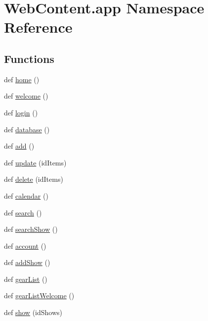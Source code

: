 \hypertarget{namespace_web_content_1_1app}{}\section{Web\+Content.\+app Namespace Reference}
\label{namespace_web_content_1_1app}
\subsection*{Functions}
\begin{DoxyCompactItemize}
\item 
def \hyperlink{namespace_web_content_1_1app_ab0090e2c92ec892cf11fed49d580737a}{home} ()
\item 
def \hyperlink{namespace_web_content_1_1app_ac220a4f6d552ae239a9fe5a933eb4c0d}{welcome} ()
\item 
def \hyperlink{namespace_web_content_1_1app_a1e55cf68c2c2c883c82749a8725e068c}{login} ()
\item 
def \hyperlink{namespace_web_content_1_1app_aeb0d3df489a674be05033bd0ba98e7a6}{database} ()
\item 
def \hyperlink{namespace_web_content_1_1app_a01e890f5f74756a5e0db012e87a3bb32}{add} ()
\item 
def \hyperlink{namespace_web_content_1_1app_a2f6071690c83608f94abb72589ab7527}{update} (id\+Items)
\item 
def \hyperlink{namespace_web_content_1_1app_a280b9c530dfd4125df19a186218bb132}{delete} (id\+Items)
\item 
def \hyperlink{namespace_web_content_1_1app_a368b9d1da5b4c987484797ecce9aabc9}{calendar} ()
\item 
def \hyperlink{namespace_web_content_1_1app_a6d7ee2ff030bada6042b07189d92a01c}{search} ()
\item 
def \hyperlink{namespace_web_content_1_1app_a26131900d865fe102463bc8eb3a797ef}{search\+Show} ()
\item 
def \hyperlink{namespace_web_content_1_1app_afe68584aa29f9b47108d88d14650c05f}{account} ()
\item 
def \hyperlink{namespace_web_content_1_1app_ada0f5f23829cfced6b4d13fbf597f82b}{add\+Show} ()
\item 
def \hyperlink{namespace_web_content_1_1app_a6e8308958b72dbb2468ed92b6389d990}{gear\+List} ()
\item 
def \hyperlink{namespace_web_content_1_1app_a1aefd89635932b2165c829b462687b74}{gear\+List\+Welcome} ()
\item 
def \hyperlink{namespace_web_content_1_1app_a6be53570f8642dc8f71ad686863336cc}{show} (id\+Shows)

\end{DoxyCompactItemize}
